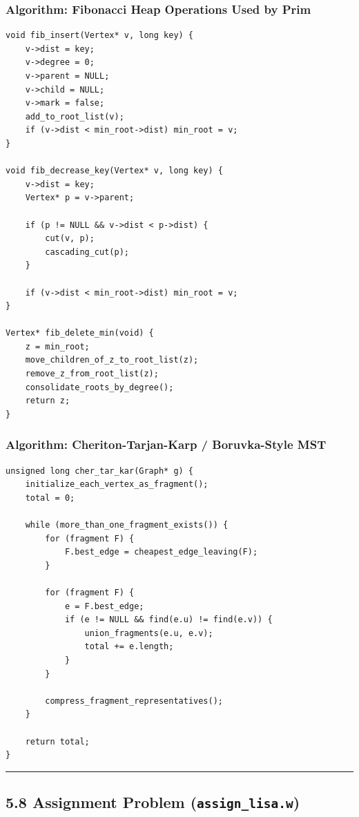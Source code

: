 \documentclass[11pt]{article}
\begin{document}
\subsubsection{Algorithm: Fibonacci Heap Operations Used by Prim}\label{algorithm-fibonacci-heap-operations-used-by-prim}

\begin{verbatim}
void fib_insert(Vertex* v, long key) {
    v->dist = key;
    v->degree = 0;
    v->parent = NULL;
    v->child = NULL;
    v->mark = false;
    add_to_root_list(v);
    if (v->dist < min_root->dist) min_root = v;
}

void fib_decrease_key(Vertex* v, long key) {
    v->dist = key;
    Vertex* p = v->parent;

    if (p != NULL && v->dist < p->dist) {
        cut(v, p);
        cascading_cut(p);
    }

    if (v->dist < min_root->dist) min_root = v;
}

Vertex* fib_delete_min(void) {
    z = min_root;
    move_children_of_z_to_root_list(z);
    remove_z_from_root_list(z);
    consolidate_roots_by_degree();
    return z;
}
\end{verbatim}

\subsubsection{Algorithm: Cheriton-Tarjan-Karp / Boruvka-Style MST}\label{algorithm-cheriton-tarjan-karp-boruvka-style-mst}

\begin{verbatim}
unsigned long cher_tar_kar(Graph* g) {
    initialize_each_vertex_as_fragment();
    total = 0;

    while (more_than_one_fragment_exists()) {
        for (fragment F) {
            F.best_edge = cheapest_edge_leaving(F);
        }

        for (fragment F) {
            e = F.best_edge;
            if (e != NULL && find(e.u) != find(e.v)) {
                union_fragments(e.u, e.v);
                total += e.length;
            }
        }

        compress_fragment_representatives();
    }

    return total;
}
\end{verbatim}

\begin{center}\rule{0.5\linewidth}{0.5pt}\end{center}

\subsection{\texorpdfstring{5.8 Assignment Problem (\texttt{assign\_lisa.w})}{5.8 Assignment Problem (assign\_lisa.w)}}\label{assignment-problem-assign_lisa.w}
\end{document}
